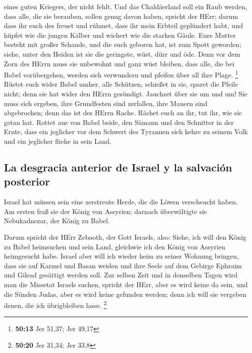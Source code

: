 eines guten Kriegers, der nicht fehlt.  Und das
Chaldäerland soll ein Raub werden, dass alle, die sie berauben, sollen
genug davon haben, spricht der HErr;  darum dass ihr euch
des freuet und rühmet, dass ihr mein Erbteil geplündert habt, und hüpfet
wie die jungen Kälber und wiehert wie die starken Gäule. 
Eure Mutter besteht mit großer Schande, und die euch geboren hat, ist
zum Spott geworden; siehe, unter den Heiden ist sie die geringste, wüst,
dürr und öde.  Denn vor dem Zorn des HErrn muss sie
unbewohnt und ganz wüst bleiben, dass alle, die bei Babel vorübergehen,
werden sich verwundern und pfeifen über all ihre Plage. \footnote{\textbf{50:13}
  Jer 51,37; Jer 49,17}  Rüstet euch wider Babel umher,
alle Schützen, schießet in sie, sparet die Pfeile nicht; denn sie hat
wider den HErrn gesündigt.  Jauchzet über sie um und um!
Sie muss sich ergeben, ihre Grundfesten sind zerfallen, ihre Mauern sind
abgebrochen; denn das ist des HErrn Rache. Rächet euch an ihr, tut ihr,
wie sie getan hat.  Rottet aus von Babel beide, den
Sämann und den Schnitter in der Ernte, dass ein jeglicher vor dem
Schwert des Tyrannen sich kehre zu seinem Volk und ein jeglicher fliehe
in sein Land.

\hypertarget{la-desgracia-anterior-de-israel-y-la-salvaciuxf3n-posterior}{%
\subsection{La desgracia anterior de Israel y la salvación
posterior}\label{la-desgracia-anterior-de-israel-y-la-salvaciuxf3n-posterior}}

 Israel hat müssen sein eine zerstreute Herde, die die
Löwen verscheucht haben. Am ersten fraß sie der König von Assyrien;
darnach überwältigte sie Nebukadnezar, der König zu Babel.

 Darum spricht der HErr Zebaoth, der Gott Israels, also:
Siehe, ich will den König zu Babel heimsuchen und sein Land, gleichwie
ich den König von Assyrien heimgesucht habe.  Israel aber
will ich wieder heim zu seiner Wohnung bringen, dass sie auf Karmel und
Basan weiden und ihre Seele auf dem Gebirge Ephraim und Gilead gesättigt
werden soll.  Zur selben Zeit und in denselben Tagen wird
man die Missetat Israels suchen, spricht der HErr, aber es wird keine da
sein, und die Sünden Judas, aber es wird keine gefunden werden; denn ich
will sie vergeben denen, die ich übrigbleiben lasse. \footnote{\textbf{50:20}
  Jer 31,34; Jer 33,8}

